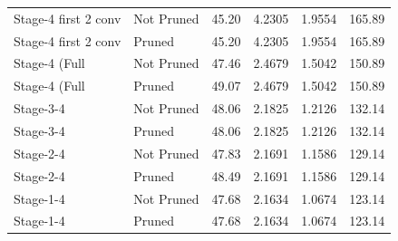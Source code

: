 \begin{table}
\begin{tabular}{llcccc}
Stage-4 first 2 conv & Not Pruned & 45.20 & 4.2305 & 1.9554 & 165.89 \\
Stage-4 first 2 conv & Pruned & 45.20 & 4.2305 & 1.9554 & 165.89 \\
Stage-4 (Full & Not Pruned & 47.46 & 2.4679 & 1.5042 & 150.89 \\
Stage-4 (Full & Pruned & 49.07 & 2.4679 & 1.5042 & 150.89 \\
Stage-3-4 & Not Pruned & 48.06 & 2.1825 & 1.2126 & 132.14 \\
Stage-3-4 & Pruned & 48.06 & 2.1825 & 1.2126 & 132.14 \\
Stage-2-4 & Not Pruned & 47.83 & 2.1691 & 1.1586 & 129.14 \\
Stage-2-4 & Pruned & 48.49 & 2.1691 & 1.1586 & 129.14 \\
Stage-1-4 & Not Pruned & 47.68 & 2.1634 & 1.0674 & 123.14 \\
Stage-1-4 & Pruned & 47.68 & 2.1634 & 1.0674 & 123.14 \\
\bottomrule
\end{tabular}
\end{table}
